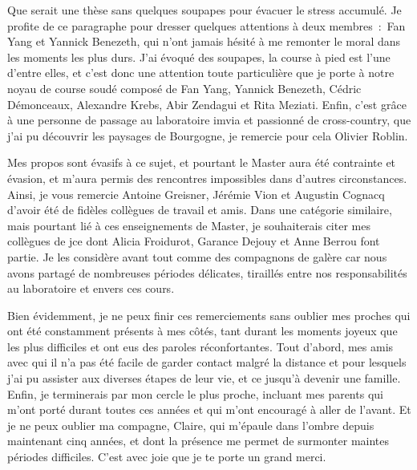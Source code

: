 \documentclass[english,standardlists]{spimubphdthesis}
\begin{document}
Que serait une thèse sans quelques soupapes pour évacuer le stress accumulé. Je profite de ce paragraphe pour dresser quelques attentions à deux membres~:~Fan Yang et Yannick Benezeth, qui n'ont jamais hésité à me remonter le moral dans les moments les plus durs. J'ai évoqué des soupapes, la course à pied est l'une d'entre elles, et c'est donc une attention toute particulière que je porte à notre noyau de course soudé composé de Fan Yang, Yannick Benezeth, Cédric Démonceaux, Alexandre Krebs, Abir Zendagui et Rita Meziati. Enfin, c'est grâce à une personne de passage au laboratoire \gls{imvia} et passionné de cross-country, que j'ai pu découvrir les paysages de Bourgogne, je remercie pour cela Olivier Roblin.\par

Mes propos sont évasifs à ce sujet, et pourtant le Master aura été contrainte et évasion, et m'aura permis des rencontres impossibles dans d'autres circonstances. Ainsi, je vous remercie Antoine Greisner, Jérémie Vion et Augustin Cognacq d'avoir été de fidèles collègues de travail et amis. Dans une catégorie similaire, mais pourtant lié à ces enseignements de Master, je souhaiterais citer mes collègues de \gls{jce} dont Alicia Froidurot, Garance Dejouy et Anne Berrou font partie. Je les considère avant tout comme des compagnons de galère car nous avons partagé de nombreuses périodes délicates, tiraillés entre nos responsabilités au laboratoire et envers ces cours.\par
 
Bien évidemment, je ne peux finir ces remerciements sans oublier mes proches qui ont été constamment présents à mes côtés, tant durant les moments joyeux que les plus difficiles et ont eus des paroles réconfortantes. Tout d'abord, mes amis avec qui il n'a pas été facile de garder contact malgré la distance et pour lesquels j'ai pu assister aux diverses étapes de leur vie, et ce jusqu'à devenir une famille. Enfin, je terminerais par mon cercle le plus proche, incluant mes parents qui m'ont porté durant toutes ces années et qui m'ont encouragé à aller de l'avant. Et je ne peux oublier ma compagne, Claire, qui m'épaule dans l'ombre depuis maintenant cinq années, et dont la présence me permet de surmonter maintes périodes difficiles. C'est avec joie que je te porte un grand merci.\par
		
\tableofcontents

\mainmatter
\renewcommand\chaptermark[1]{\markboth{\uppercase{#1}}{}}
\renewcommand\glossarymark[1]{\markboth{\uppercase{#1}}{}}
\end{document}
